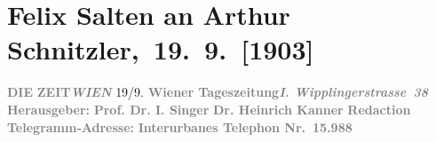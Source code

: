 

         
         \renewcommand{\erwaehntePersonen}{Personen: Max Eugen Burckhard, Karl Glossy, Heinrich Kanner, Richard Muther, Ferdinand von Saar, Felix Salten, August Sauer, Isidor Singer}
         \renewcommand{\erwaehnteInstitutionen}{Institutionen: Die Zeit}
         \renewcommand{\erwaehnteOrte}{Orte: Wien, Wipplingerstraße}
         \renewcommand{\erwaehnteWerke}{}
               \section[ Felix Salten an Arthur Schnitzler, 19. 9. {[}1903{]}]{ Felix Salten an Arthur Schnitzler, 19. 9. {[}1903{]}}\nopagebreak{}\rehead{ }\begin{ledgroupsized}[t]{13cm}\normalsize\beginnumbering \toendnotes[C]{\smallbreak\pagebreak[2]} 
\toendnotes[C]{\smallbreak}\pstart
           \noindent{}{\pb}\textcolor{gray}{\textbf{DIE}}\pend
           \pstart
           \textcolor{gray}{\textbf{ZEIT}}\hfill \textcolor{gray}{\textbf{\emph{WIEN}}}{ }19/9.\pend
           \pstart
           \textcolor{gray}{\textbf{Wiener Tageszeitung}}\hfill \textcolor{gray}{\textbf{\emph{I. Wipplingerstrasse 38}}}\pend
           \pstart
           \textcolor{gray}{\textbf{Herausgeber:}}\pend
           \pstart
           \textcolor{gray}{\textbf{\textbf{Prof. Dr. I. Singer}}}\pend
           \pstart
           \textcolor{gray}{\textbf{\textbf{Dr. Heinrich Kanner}}}\pend
           \pstart
           \textcolor{gray}{\textbf{\textbf{Redaction}}}\pend
           \pstart
           \textcolor{gray}{\textbf{Telegramm-Adresse: \so{,}{ }}}\pend
           \pstart
           \textcolor{gray}{\textbf{Interurbanes Telephon Nr. 15.988}}\pend

\end{ledgroupsized}
